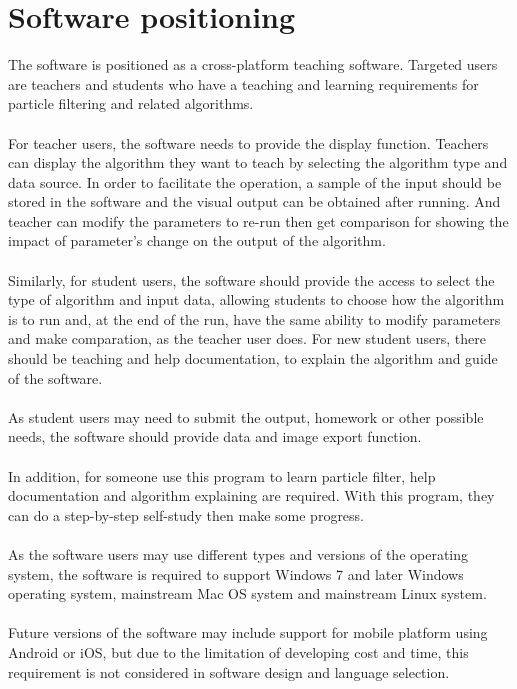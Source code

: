 \documentclass[11pt,oneside,a4paper]{article}
\begin{document}
\section{Software positioning}

The software is positioned as a cross-platform teaching software. Targeted users are teachers and students who have a teaching and learning requirements for particle filtering and related algorithms.
\\\\For teacher users, the software needs to provide the display function. Teachers can display the algorithm they want to teach by selecting the algorithm type and data source. In order to facilitate the operation, a sample of the input should be stored in the software and the visual output can be obtained after running. And teacher can modify the parameters to re-run then get comparison for showing the impact of parameter’s change on the output of the algorithm.
\\\\Similarly, for student users, the software should provide the access to select the type of algorithm and input data, allowing students to choose how the algorithm is to run and, at the end of the run, have the same ability to modify parameters and make comparation, as the teacher user does. For new student users, there should be teaching and help documentation, to explain the algorithm and guide of the software.
\\\\As student users may need to submit the output, homework or other possible needs, the software should provide data and image export function.
\\\\In addition, for someone use this program to learn particle filter, help documentation and algorithm explaining are required. With this program, they can do a step-by-step self-study then make some progress.
\\\\As the software users may use different types and versions of the operating system, the software is required to support Windows 7 and later Windows operating system, mainstream Mac OS system and mainstream Linux system.
\\\\Future versions of the software may include support for mobile platform using Android or iOS, but due to the limitation of developing cost and time, this requirement is not considered in software design and language selection.
\end{document}
